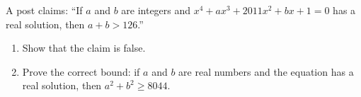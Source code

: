 A post claims: ``If $a$ and $b$ are integers and $x^4+ax^3+2011x^2+bx+1=0$ has a real solution, then $a+b>126$.''
\begin{enumerate}
\item[(a)] Show that the claim is false.
\item[(b)] Prove the correct bound: if $a$ and $b$ are real numbers and the equation has a real solution, then $a^2+b^2\ge8044$.
\end{enumerate}
